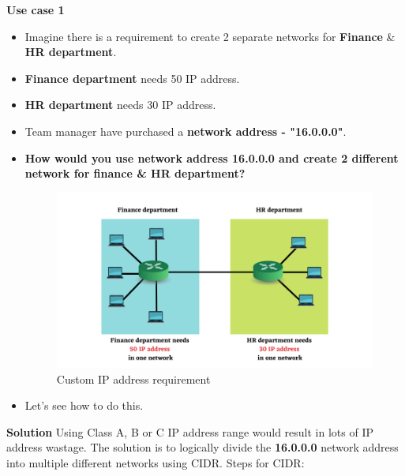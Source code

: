 \setlength{\columnsep}{3pt}
\begin{flushleft}
	\textbf{Use case 1}
	\begin{itemize}
		\item Imagine there is a requirement to create 2 separate networks for \textbf{Finance} \& \textbf{HR department}.
		\item \textbf{Finance department} needs 50 IP address.
		\item \textbf{HR department} needs 30 IP address.
		\item Team manager have purchased a \textbf{network address - "16.0.0.0"}.
		\item \textbf{How would you use network address 16.0.0.0 and create 2 different network for finance \& HR department?}
		\begin{figure}[h!]
			\centering
			\includegraphics[scale=.65]{content/chapter14/images/depart.png}
			\caption{Custom IP address requirement}
			\label{fig:cidr}
		\end{figure}	
		\item Let's see how to do this.
	\end{itemize}
	
	\newpage
	\textbf{Solution}
	\newline
	Using Class A, B or C IP address range would result in lots of IP address wastage.
	\newline
	The solution is to logically divide the \textbf{16.0.0.0} network address into multiple different networks using CIDR.
	\newline
	Steps for CIDR:
	\begin{itemize}
		

\end{itemize}
\end{flushleft}
